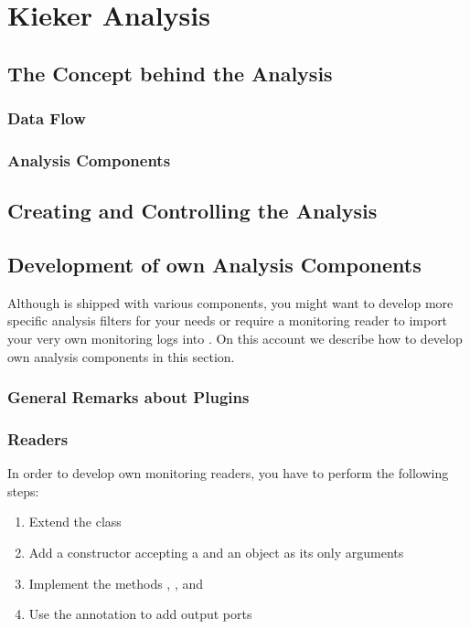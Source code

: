 \chapter{Kieker Analysis}\label{chp:Kieker-Analysis}
	\section{The Concept behind the Analysis}	
		\subsection{Data Flow}
		\subsection{Analysis Components}
	\section{Creating and Controlling the Analysis}
	\section{Development of own Analysis Components}
	
		 Although \Kieker{} is shipped with various components, you might want to develop more specific analysis filters for your needs or require a monitoring reader to import your very own monitoring logs into \Kieker{}. On this account we describe how to develop own analysis components in this section.
	
		\subsection{General Remarks about Plugins}
		
		\subsection{Readers}
		
			In order to develop own monitoring readers, you have to perform the following steps:
			\begin{enumerate}
				\setlength{\itemsep}{-2pt}
				\item Extend the class 
				\item Add a constructor accepting a  and an  object as its only arguments
				\item Implement the methods , , and 
				\item Use the  annotation to add output ports
			\end{enumerate}
		
